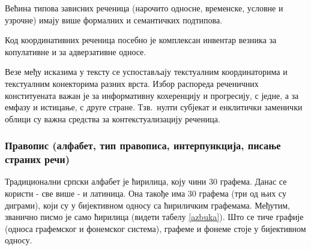 \begin{multicols}{2}
Већина типова зависних реченица (нарочито односне, временске, условне и узрочне) имају више формалних и семантичких подтипова. 

Код координативних реченица посебно је комплексан инвентар везника за копулативне и за адверзативне односе.

Везе међу исказима у тексту се успостављају текстуалним координаторима и текстуалним конекторима разних врста. Избор распореда реченичних конституената важан је за информативну кохеренцију и прогресију, с једне, а за емфазу и истицање, с друге стране. Тзв.~нулти субјекат и енклитички заменички облици су важна средства за контекстуализацију реченица.


\subsubsection {Правопис (алфабет, тип правописа, интерпункција, писање страних речи)}
  
Традиционални српски алфабет је ћирилица, коју чини 30 графема. Данас се користи - све више - и латиница. Она такође има 30 графема (три од њих су диграми), који су у бијективном односу са ћириличким графемама. Међутим, званично писмо је само ћирилица (видети табелу \ref{azbuka}).
Што се тиче графије (односа графемског и фонемског система), графеме и фонеме стоје  у бијективном односу.


\end{multicols}
